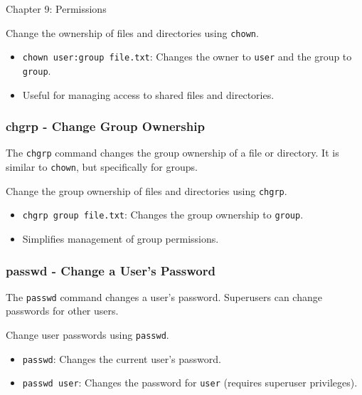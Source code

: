 \begin{notes}{Chapter 9: Permissions}
\begin{highlight}
    Change the ownership of files and directories using \texttt{chown}.
    
    \begin{itemize}
        \item \texttt{chown user:group file.txt}: Changes the owner to \texttt{user} and the group to \texttt{group}.
        \item Useful for managing access to shared files and directories.
    \end{itemize}
    
    \end{highlight}
    
    \subsubsection*{chgrp - Change Group Ownership}
    
    The \texttt{chgrp} command changes the group ownership of a file or directory. It is similar to \texttt{chown}, but specifically for groups.
    
    \begin{highlight}
    
    Change the group ownership of files and directories using \texttt{chgrp}.
    
    \begin{itemize}
        \item \texttt{chgrp group file.txt}: Changes the group ownership to \texttt{group}.
        \item Simplifies management of group permissions.
    \end{itemize}
    
    \end{highlight}
    
    \subsubsection*{passwd - Change a User's Password}
    
    The \texttt{passwd} command changes a user's password. Superusers can change passwords for other users.
    
    \begin{highlight}
    
    Change user passwords using \texttt{passwd}.
    
    \begin{itemize}
        \item \texttt{passwd}: Changes the current user's password.
        \item \texttt{passwd user}: Changes the password for \texttt{user} (requires superuser privileges).
    \end{itemize}
    

\end{highlight}
\end{notes}
